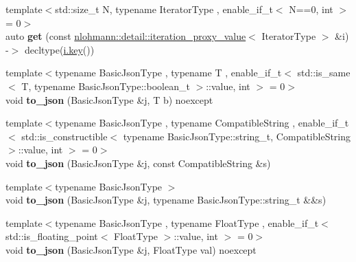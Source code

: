 \begin{DoxyCompactItemize}
{\footnotesize template$<$std\+::size\+\_\+t N, typename Iterator\+Type , enable\+\_\+if\+\_\+t$<$ N==0, int $>$  = 0$>$ }\\auto {\bfseries get} (const \hyperlink{classnlohmann_1_1detail_1_1iteration__proxy__value}{nlohmann\+::detail\+::iteration\+\_\+proxy\+\_\+value}$<$ Iterator\+Type $>$ \&i) -\/$>$ decltype(\hyperlink{namespacenlohmann_1_1detail_a59e696b1dad6d0d99c172ac4518c2042a3c6e0b8a9c15224a8228b9a98ca1531d}{i.\+key}())
\item 
\mbox{\label{namespacenlohmann_1_1detail_a1a804b98cbe89b7e44b698f2ca860490}} 
{\footnotesize template$<$typename Basic\+Json\+Type , typename T , enable\+\_\+if\+\_\+t$<$ std\+::is\+\_\+same$<$ T, typename Basic\+Json\+Type\+::boolean\+\_\+t $>$\+::value, int $>$  = 0$>$ }\\void {\bfseries to\+\_\+json} (Basic\+Json\+Type \&j, T b) noexcept
\item 
\mbox{\label{namespacenlohmann_1_1detail_a7356ed05cdbbb080cee80e1211e1c6c9}} 
{\footnotesize template$<$typename Basic\+Json\+Type , typename Compatible\+String , enable\+\_\+if\+\_\+t$<$ std\+::is\+\_\+constructible$<$ typename Basic\+Json\+Type\+::string\+\_\+t, Compatible\+String $>$\+::value, int $>$  = 0$>$ }\\void {\bfseries to\+\_\+json} (Basic\+Json\+Type \&j, const Compatible\+String \&s)
\item 
\mbox{\label{namespacenlohmann_1_1detail_a4aa1ca6b7c61bf19d1f30ea5b669f68e}} 
{\footnotesize template$<$typename Basic\+Json\+Type $>$ }\\void {\bfseries to\+\_\+json} (Basic\+Json\+Type \&j, typename Basic\+Json\+Type\+::string\+\_\+t \&\&s)
\item 
\mbox{\label{namespacenlohmann_1_1detail_a22bffdc8bc7e43af380ba2050696b230}} 
{\footnotesize template$<$typename Basic\+Json\+Type , typename Float\+Type , enable\+\_\+if\+\_\+t$<$ std\+::is\+\_\+floating\+\_\+point$<$ Float\+Type $>$\+::value, int $>$  = 0$>$ }\\void {\bfseries to\+\_\+json} (Basic\+Json\+Type \&j, Float\+Type val) noexcept
\item 
\mbox{\label{namespacenlohmann_1_1detail_ae5fd66b5517b3b5a6c6b9fd9f29ba8dc}} 

\end{DoxyCompactItemize}
